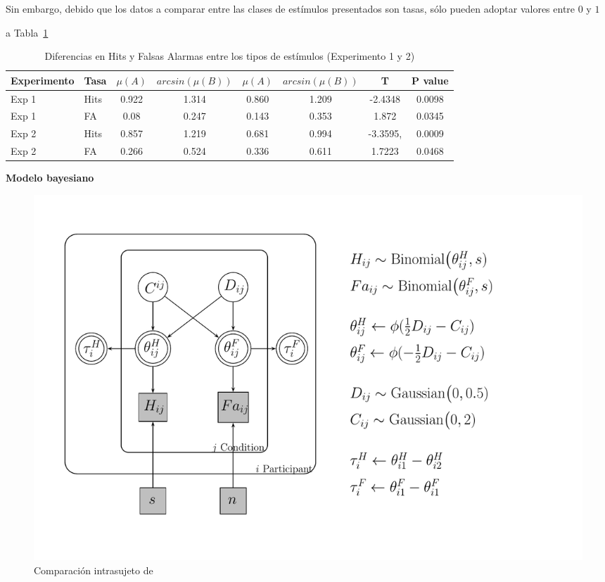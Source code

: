 Sin embargo, debido que los datos a comparar entre las clases de estímulos presentados son tasas, sólo pueden adoptar valores entre $0$ y $1$ 

a Tabla~\ref{Tabla_t-HitsyFA}\\


\begin{table}
\caption[Prueba T para evaluar diferencias en las medias de las tasas de ejecución (Hits y F. Alarmas) entre condiciones]{Diferencias en Hits y Falsas Alarmas entre los tipos de estímulos (Experimento 1 y 2)}
\label{Tabla_t-HitsyFA}
\centering
\begin{tabular}{l l | c c c c c c}
\toprule
\textbf{Experimento} & \textbf{Tasa} & \textbf{$\mu(A)$} & \textbf{$arcsin(\mu(B))$} & \textbf{$\mu(A)$} & \textbf{$arcsin(\mu(B))$} &\textbf{T} & \textbf{P value}\\
\midrule
Exp 1 & Hits & 0.922 & 1.314 & 0.860 & 1.209 & -2.4348 & 0.0098 \\
Exp 1 & FA & 0.08 & 0.247 & 0.143 & 0.353 & 1.872 & 0.0345 \\
Exp 2 & Hits & 0.857 & 1.219 & 0.681 & 0.994 & -3.3595, & 0.0009 \\
Exp 2 & FA & 0.266 & 0.524 & 0.336 & 0.611 & 1.7223 & 0.0468 \\
\bottomrule
\end{tabular}
\end{table}

\textbf{Modelo bayesiano}


\begin{figure}[th]
\centering
\includegraphics[width=1.1\textwidth]{Figures/Model_Tau_Diff_Tetas}
\caption[Modelo Tau: Modelo Bayesiano para evaluar las diferencias entre las tasas de hits y falsas alarmas]{Comparación intrasujeto de}
\label{fig:Mod_Tau}
\end{figure}















